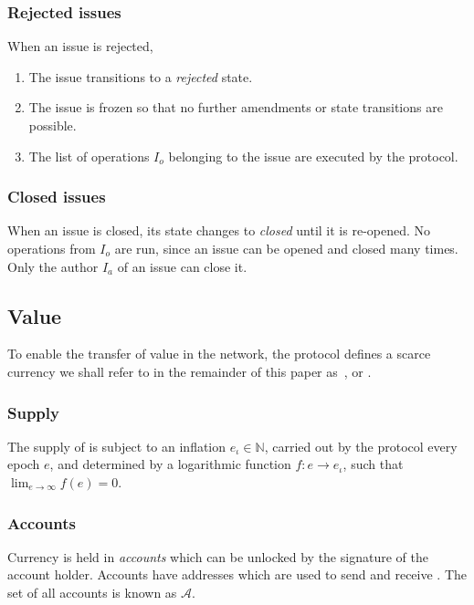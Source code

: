 \subsubsection{Rejected issues} When an issue is rejected,
\begin{enumerate}
    \item The issue transitions to a \emph{rejected} state.
    \item The issue is frozen so that no further amendments or state
        transitions are possible.
    \item The list of operations $I_o$ belonging to the issue are executed by
        the protocol.
\end{enumerate}

\subsubsection{Closed issues} When an issue is closed, its state changes to
\emph{closed} until it is re-opened. No operations from $I_o$ are run, since
an issue can be opened and closed many times. Only the author $I_a$ of an issue
can close it.

\subsection{Value}

To enable the transfer of value in the network, the protocol defines a scarce
currency we shall refer to in the remainder of this paper as~\coin{}, or
\oscoin{}.

\subsubsection{Supply}

The supply of \coin{} is subject to an inflation $e_{\iota} \in \mathbb{N}$,
carried out by the protocol every epoch $e$, and determined by a logarithmic
function $f : e \to e_{\iota}$, such that $\lim_{e \to \infty} f(e) = 0$.

\subsubsection{Accounts}
\label{accounts}

Currency is held in \emph{accounts} which can be unlocked by the signature of
the account holder. Accounts have addresses which are used to send and receive
\coin{}. The set of all accounts is known as $\mathcal{A}$.

